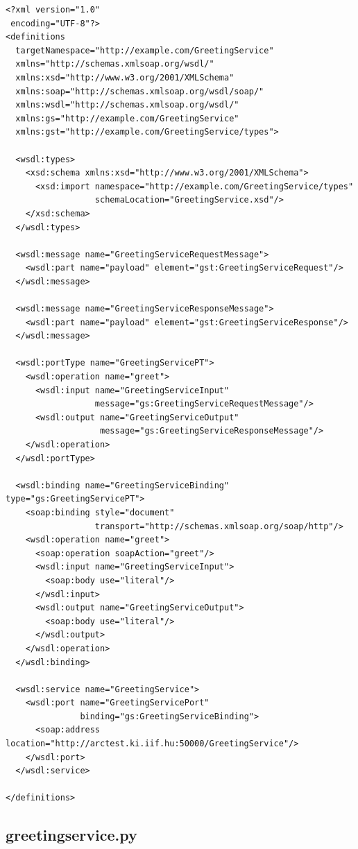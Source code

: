 \documentclass{article}
\begin{document}
\begin{verbatim}
<?xml version="1.0"
 encoding="UTF-8"?>
<definitions
  targetNamespace="http://example.com/GreetingService"
  xmlns="http://schemas.xmlsoap.org/wsdl/"
  xmlns:xsd="http://www.w3.org/2001/XMLSchema"
  xmlns:soap="http://schemas.xmlsoap.org/wsdl/soap/"
  xmlns:wsdl="http://schemas.xmlsoap.org/wsdl/"
  xmlns:gs="http://example.com/GreetingService"
  xmlns:gst="http://example.com/GreetingService/types">

  <wsdl:types> 
    <xsd:schema xmlns:xsd="http://www.w3.org/2001/XMLSchema"> 
      <xsd:import namespace="http://example.com/GreetingService/types" 
                  schemaLocation="GreetingService.xsd"/> 
    </xsd:schema> 
  </wsdl:types> 

  <wsdl:message name="GreetingServiceRequestMessage"> 
    <wsdl:part name="payload" element="gst:GreetingServiceRequest"/> 
  </wsdl:message> 

  <wsdl:message name="GreetingServiceResponseMessage"> 
    <wsdl:part name="payload" element="gst:GreetingServiceResponse"/> 
  </wsdl:message>

  <wsdl:portType name="GreetingServicePT"> 
    <wsdl:operation name="greet"> 
      <wsdl:input name="GreetingServiceInput"
                  message="gs:GreetingServiceRequestMessage"/> 
      <wsdl:output name="GreetingServiceOutput" 
                   message="gs:GreetingServiceResponseMessage"/> 
    </wsdl:operation> 
  </wsdl:portType> 

  <wsdl:binding name="GreetingServiceBinding" type="gs:GreetingServicePT"> 
    <soap:binding style="document" 
                  transport="http://schemas.xmlsoap.org/soap/http"/> 
    <wsdl:operation name="greet"> 
      <soap:operation soapAction="greet"/> 
      <wsdl:input name="GreetingServiceInput"> 
        <soap:body use="literal"/> 
      </wsdl:input> 
      <wsdl:output name="GreetingServiceOutput"> 
        <soap:body use="literal"/> 
      </wsdl:output> 
    </wsdl:operation> 
  </wsdl:binding> 

  <wsdl:service name="GreetingService"> 
    <wsdl:port name="GreetingServicePort" 
               binding="gs:GreetingServiceBinding"> 
      <soap:address location="http://arctest.ki.iif.hu:50000/GreetingService"/> 
    </wsdl:port> 
  </wsdl:service> 

</definitions>
\end{verbatim}

\subsection{greetingservice.py}
\label{app:pysrc}
\end{document}
